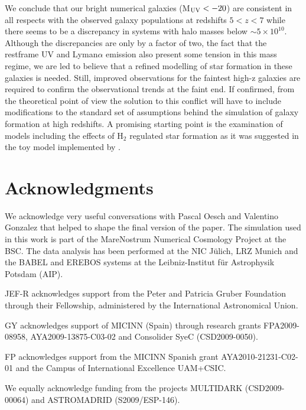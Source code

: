 \documentclass{emulateapj}
\newcommand{\hMsun}{{\ifmmode{h^{-1}{\rm {M_{\odot}}}}\else{$h^{-1}{\rm{M_{\odot}}}$}\fi}}
\begin{document}
We conclude that our bright numerical galaxies (M$_{\rm UV}<-20$)
are consistent in all respects with the observed
galaxy populations at redshifts $5<z<7$ while there seems to be a 
discrepancy in systems with halo masses below $\sim 5\times
10^{10}$\hMsun. Although the discrepancies are only by a factor of two, the  fact that the restframe UV and Lyman$\alpha$ emission also present some tension in this mass regime, we are led to believe that a refined modelling of star formation in these galaxies is needed. Still, improved observations for the faintest high-z galaxies are required to confirm the observational trends at the faint end. If confirmed, from the theoretical point of view the solution to this conflict will have to include modifications to the standard set of assumptions behind the simulation of galaxy formation at high redshifts. A promising starting point is the examination of models including the effects of H$_2$ regulated star formation \citep{2012ApJ...749...36K} as it was suggested in the toy model implemented by \cite{2011arXiv1106.0301K}.


\section*{Acknowledgments}

We acknowledge very useful conversations with Pascal Oesch and
Valentino Gonzalez that helped to shape the final version of the
paper. The simulation used in this work is part of the MareNostrum
Numerical Cosmology Project at the BSC. The data analysis has been
performed at the NIC J\"ulich, LRZ Munich and the BABEL and EREBOS
systems at the Leibniz-Institut f\"ur Astrophysik Potsdam (AIP).

JEF-R acknowledges support from the Peter and Patricia Gruber
Foundation through their Fellowship, administered by the International
Astronomical Union. 

GY acknowledges support of  MICINN  (Spain) through research grants
FPA2009-08958, AYA2009-13875-C03-02 and Consolider SyeC (CSD2009-0050).

FP acknowledges support from the MICINN Spanish grant
AYA2010-21231-C02-01 and the Campus of International Excellence
UAM+CSIC. 

We equally acknowledge funding from the projects MULTIDARK (CSD2009-00064)
and ASTROMADRID (S2009/ESP-146). 




 
\end{document}
